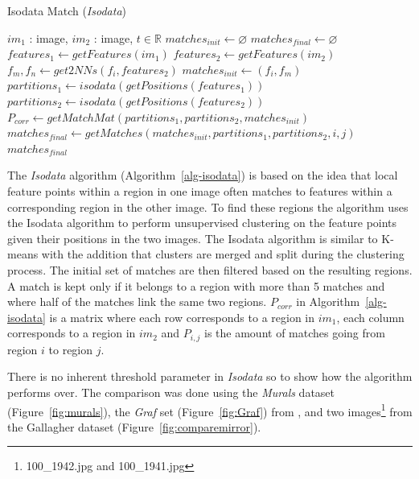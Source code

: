 \documentclass{article}
\begin{document}
\begin{algorithm}
\caption{Isodata Match (\emph{Isodata})}
\label{alg-isodata}
\begin{algorithmic}
\Require $im_1$ : image, $im_2$ : image, $t \in \mathbb{R}$
\State $matches_{init}\gets \varnothing$
\State $matches_{final}\gets \varnothing$
\State $features_1 \gets getFeatures(im_1)$
\State $features_2 \gets getFeatures(im_2)$
    \State $f_m,f_n \gets get2NNs(f_i, features_2)$
    \State $matches_{init} \gets \left(f_i, f_m\right)$
\EndFor
\State $partitions_1 \gets isodata(getPositions(features_1))$
\State $partitions_2 \gets isodata(getPositions(features_2))$
\State $P_{corr} \gets getMatchMat(partitions_1, partitions_2, 
matches_{init})$
        \State $matches_{final} \gets getMatches(matches_{init}, 
        partitions_1, partitions_2, i, j)$
    \EndIf
\EndFor
\Return $matches_{final}$
\end{algorithmic}
\end{algorithm}

The \emph{Isodata} algorithm (Algorithm~\ref{alg-isodata}) 
\cite{das2008event} is based on the idea that local feature points 
within a region in one image often matches to features within a 
corresponding region in the other image. To find these regions the 
algorithm uses the Isodata algorithm \cite{ball1965isodata} to perform 
unsupervised clustering on the feature points given their positions in 
the two images. The Isodata algorithm is similar to K-means with the 
addition that clusters are merged and split during the clustering 
process. The initial set of matches are then filtered based on the 
resulting regions. A match is kept only if it belongs to a region with 
more than 5 matches and where half of the matches link the same two 
regions. $P_{corr}$ in Algorithm~\ref{alg-isodata} is a matrix where 
each row corresponds to a region in $im_1$, each column corresponds to a 
region in $im_2$ and $P_{i,j}$ is the amount of matches going from 
region $i$ to region $j$.

There is no inherent threshold parameter in \emph{Isodata} so to show 
how the algorithm performs over.
The comparison was done using the \emph{Murals} dataset 
(Figure~\ref{fig:murals}), the \emph{Graf} set (Figure~\ref{fig:Graf}) 
from \cite{mikolajczyk2005performance}, and two 
images\footnote{100\_1942.jpg and 100\_1941.jpg} from the Gallagher 
dataset \cite{gallagher2008} (Figure~\ref{fig:comparemirror}).
\end{document}
